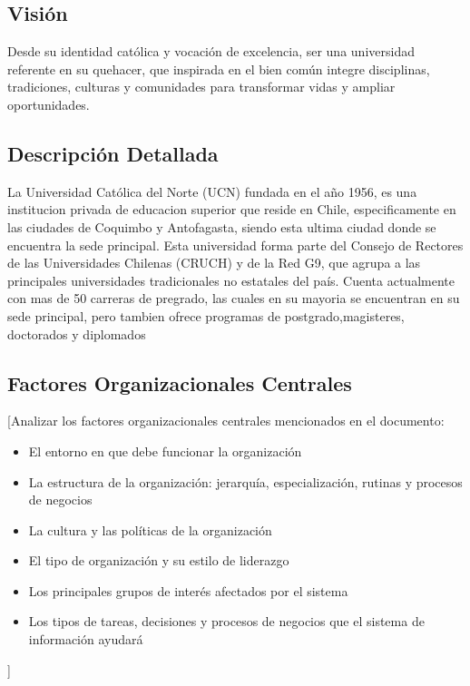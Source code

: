 \documentclass[12pt,letterpaper]{report}
\begin{document}
\subsection{Visión}
Desde su identidad católica y vocación de excelencia, ser una universidad referente en su quehacer, que inspirada en el bien común integre disciplinas, tradiciones, culturas y comunidades para transformar vidas y ampliar oportunidades. 

\subsection{Descripción Detallada}
La Universidad Católica del Norte (UCN) fundada en el año 1956, es una institucion privada de educacion superior que reside en Chile, especificamente en las ciudades de Coquimbo y Antofagasta, siendo esta ultima ciudad donde se encuentra la sede principal. Esta universidad forma parte del Consejo de Rectores de las Universidades Chilenas (CRUCH) y de la Red G9, que agrupa a las principales universidades tradicionales no estatales del país. Cuenta  actualmente con mas de 50 carreras de pregrado, las cuales en su mayoria se encuentran en su sede principal, pero tambien ofrece programas de postgrado,magisteres, doctorados y diplomados

\subsection{Factores Organizacionales Centrales}
[Analizar los factores organizacionales centrales mencionados en el documento:
\begin{itemize}
    \item El entorno en que debe funcionar la organización
    \item La estructura de la organización: jerarquía, especialización, rutinas y procesos de negocios
    \item La cultura y las políticas de la organización
    \item El tipo de organización y su estilo de liderazgo
    \item Los principales grupos de interés afectados por el sistema
    \item Los tipos de tareas, decisiones y procesos de negocios que el sistema de información ayudará
\end{itemize}]

\end{document}
